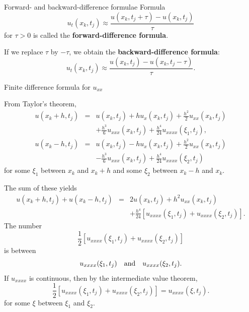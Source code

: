 \documentclass{beamer}
\begin{document}


\begin{frame}{Forward- and backward-difference formulae}
Formula
\[
u_{t}(x_k,t_j)\approx \frac{u(x_k,t_j+\tau)-u(x_k,t_j)}{\tau}
\]
for $\tau>0$ is called the {\bf forward-difference formula}.

\vskip 5mm
If we replace $\tau$ by $-\tau$, we obtain
the {\bf backward-difference formula}:
\[
u_{t}(x_k,t_j)\approx \frac{u(x_k,t_j)-u(x_k,t_j-\tau)}{\tau}.
\]


\end{frame}



\begin{frame}{Finite difference formula for $u_{xx}$}

From Taylor's theorem,
\begin{eqnarray}
u(x_k+h,t_j)&=&u(x_k,t_j)+h u_{x}(x_k,t_j)+
\frac{h^2}{2}u_{xx}(x_k,t_j) \nonumber \\
&&+
\frac{h^3}{6}u_{xxx}(x_k,t_{j})+
\frac{h^4}{24}u_{xxxx}(\xi_1,t_{j}), \nonumber \\
u(x_k-h,t_j)&=&u(x_k,t_j)-h u_{x}(x_k,t_j)+
\frac{h^2}{2}u_{xx}(x_k,t_j) \nonumber \\
&&-
\frac{h^3}{6}u_{xxx}(x_k,t_{j})+
\frac{h^4}{24}u_{xxxx}(\xi_2,t_{j}) \nonumber
\end{eqnarray}
for some $\xi_{1}$ between $x_{k}$ and $x_{k}+h$
and some $\xi_{2}$ between $x_{k}-h$ and $x_{k}$.

\end{frame}



\begin{frame}{}
The sum of these yields
\begin{eqnarray}
u(x_k+h,t_j)+u(x_k-h,t_j)&=&2u(x_k,t_j)+ h^2u_{xx}(x_k,t_j) \nonumber \\
&&+ \frac{h^4}{24}\left[u_{xxxx}(\xi_1,t_{j}) +
u_{xxxx}(\xi_2,t_{j})\right].  \nonumber
\end{eqnarray}
The number
\[
\frac{1}{2}\left[u_{xxxx}(\xi_{1}, t_{j})+u_{xxxx}(\xi_{2},t_{j})\right]
\]
is between
\[
u_{xxxx}(\xi_{1},t_{j}) \quad {\rm and} \quad u_{xxxx}(\xi_{2},t_{j}).
\]
If $u_{xxxx}$ is continuous, then
by the intermediate value theorem,
\[
\frac{1}{2}\left[u_{xxxx}(\xi_{1},t_{j})+u_{xxxx}(\xi_{2},t_{j})\right]
=u_{xxxx}(\xi,t_{j}).
\]
for some $\xi$ between $\xi_{1}$ and $\xi_{2}$.





\end{frame}
\end{document}
